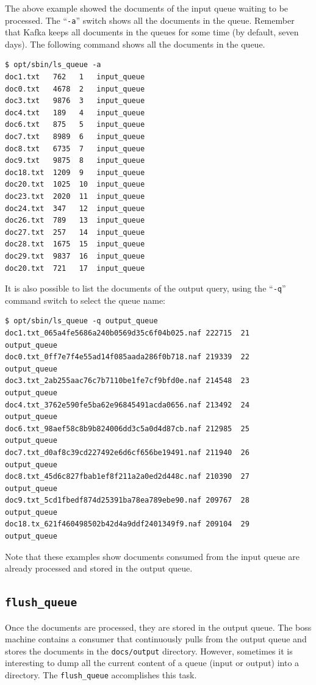 \documentclass[a4]{article}
\begin{document}
The above example showed the documents of the input queue waiting to be
processed. The ``\texttt{-a}'' switch shows all the documents in the
queue. Remember that Kafka keeps all documents in the queues for some time
(by default, seven days). The following command shows all the documents in
the queue.

\begin{verbatim}
$ opt/sbin/ls_queue -a
doc1.txt   762   1   input_queue
doc0.txt   4678  2   input_queue
doc3.txt   9876  3   input_queue
doc4.txt   189   4   input_queue
doc6.txt   875   5   input_queue
doc7.txt   8989  6   input_queue
doc8.txt   6735  7   input_queue
doc9.txt   9875  8   input_queue
doc18.txt  1209  9   input_queue
doc20.txt  1025  10  input_queue
doc23.txt  2020  11  input_queue
doc24.txt  347   12  input_queue
doc26.txt  789   13  input_queue
doc27.txt  257   14  input_queue
doc28.txt  1675  15  input_queue
doc29.txt  9837  16  input_queue
doc20.txt  721   17  input_queue
\end{verbatim}

It is also possible to list the documents of the output query, using the
``\texttt{-q}'' command switch to select the queue name:

\begin{verbatim}
$ opt/sbin/ls_queue -q output_queue
doc1.txt_065a4fe5686a240b0569d35c6f04b025.naf 222715  21   output_queue
doc0.txt_0ff7e7f4e55ad14f085aada286f0b718.naf 219339  22   output_queue
doc3.txt_2ab255aac76c7b7110be1fe7cf9bfd0e.naf 214548  23   output_queue
doc4.txt_3762e590fe5ba62e96845491acda0656.naf 213492  24   output_queue
doc6.txt_98aef58c8b9b824006dd3c5a0d4d87cb.naf 212985  25   output_queue
doc7.txt_d0af8c39cd227492e6d6cf656be19491.naf 211940  26   output_queue
doc8.txt_45d6c827fbab1ef8f211a2a0ed2d448c.naf 210390  27   output_queue
doc9.txt_5cd1fbedf874d25391ba78ea789ebe90.naf 209767  28   output_queue
doc18.tx_621f460498502b42d4a9ddf2401349f9.naf 209104  29   output_queue
\end{verbatim}

Note that these examples show documents consumed from the input queue are
already processed and stored in the output queue.

\subsection*{\texttt{flush\_queue}}
\label{sec:flush_queue}

Once the documents are processed, they are stored in the output queue. The
boss machine contains a consumer that continuously pulls from the output
queue and stores the documents in the \texttt{docs/output}
directory. However, sometimes it is interesting to dump all the current
content of a queue (input or output) into a directory. The
\texttt{flush\_queue} accomplishes this task.
\end{document}
